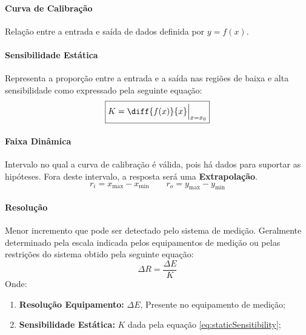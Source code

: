 \documentclass{article}
\begin{document}
            \paragraph{Curva de Calibração}Relação entre a entrada e saída de dados definida por $y = f(x)$.

            \paragraph{Sensibilidade Estática}Representa a proporção entre a entrada e a saída nas regiões de baixa e alta sensibilidade como expressado pela seguinte equação:
                \begin{equation}
                    \boxed{
                        K = \diff{f(x)}{x}\Bigr|_{\substack{x = x_{0}}}
                    }\label{eq:staticSensitibility}
                \end{equation}

            \paragraph{Faixa Dinâmica}Intervalo no qual a curva de calibração é válida, pois há dados para suportar as hipóteses. Fora deste intervalo, a resposta será uma \textbf{Extrapolação}.
                \begin{equation}
                    \boxed{r_{i} = x_{\text{max}} - x_{\text{min}}}
                    \qquad
                    \boxed{r_{o} = y_{\text{max}} - y_{\text{min}}}
                \end{equation}

            \paragraph{Resolução}Menor incremento que pode ser detectado pelo sistema de medição. Geralmente determinado pela escala indicada pelos equipamentos de medição ou pelas restrições do sistema obtido pela seguinte equação:
                \begin{equation}
                    \boxed{\Delta R = \frac{\Delta E}{K}}
                \end{equation}
            Onde:
                \begin{enumerate}[rightmargin = \leftmargin]
                    \item \textbf{Resolução Equipamento:} $\Delta E$, Presente no equipamento de medição;
                    \item \textbf{Sensibilidade Estática:} $K$ dada pela equação \ref{eq:staticSensitibility};
                \end{enumerate}
\end{document}
